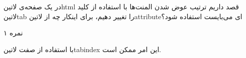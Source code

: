 
در یک صفحه‌ی ‌لاتین{html} قصد داریم ترتیب عوض شدن المنت‌ها با استفاده از کلید ‌لاتین{tab} را تغییر دهیم، برای اینکار چه از ‌لاتین{attribute}ای می‌بایست استفاده شود؟

۱ نمره


با استفاده از صفت ‌لاتین{tabindex} این امر ممکن است.


